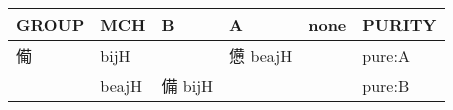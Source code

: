 \documentclass[14pt,a4paper]{scrartcl}
\begin{document}
\begin{longtable}[c]{@{}llllll@{}}
\toprule
\begin{minipage}[b]{0.14\columnwidth}\raggedright\strut
GROUP
\strut\end{minipage} &
\begin{minipage}[b]{0.14\columnwidth}\raggedright\strut
MCH
\strut\end{minipage} &
\begin{minipage}[b]{0.14\columnwidth}\raggedright\strut
B
\strut\end{minipage} &
\begin{minipage}[b]{0.14\columnwidth}\raggedright\strut
A
\strut\end{minipage} &
\begin{minipage}[b]{0.14\columnwidth}\raggedright\strut
none
\strut\end{minipage} &
\begin{minipage}[b]{0.14\columnwidth}\raggedright\strut
PURITY
\strut\end{minipage}\tabularnewline
\midrule
\endhead
\begin{minipage}[t]{0.14\columnwidth}\raggedright\strut
僃
\strut\end{minipage} &
\begin{minipage}[t]{0.14\columnwidth}\raggedright\strut
bijH
\strut\end{minipage} &
\begin{minipage}[t]{0.14\columnwidth}\raggedright\strut
\strut\end{minipage} &
\begin{minipage}[t]{0.14\columnwidth}\raggedright\strut
憊 beajH
\strut\end{minipage} &
\begin{minipage}[t]{0.14\columnwidth}\raggedright\strut
\strut\end{minipage} &
\begin{minipage}[t]{0.14\columnwidth}\raggedright\strut
pure:A
\strut\end{minipage}\tabularnewline
\begin{minipage}[t]{0.14\columnwidth}\raggedright\strut
𤰈
\strut\end{minipage} &
\begin{minipage}[t]{0.14\columnwidth}\raggedright\strut
beajH
\strut\end{minipage} &
\begin{minipage}[t]{0.14\columnwidth}\raggedright\strut
備 bijH
\strut\end{minipage} &
\begin{minipage}[t]{0.14\columnwidth}\raggedright\strut
\strut\end{minipage} &
\begin{minipage}[t]{0.14\columnwidth}\raggedright\strut
\strut\end{minipage} &
\begin{minipage}[t]{0.14\columnwidth}\raggedright\strut
pure:B
\strut\end{minipage}\tabularnewline
\bottomrule
\end{longtable}
\end{document}
